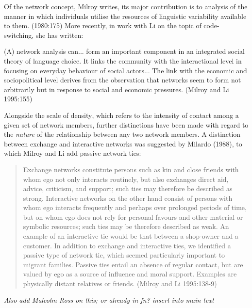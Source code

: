 Of the network concept, Milroy writes, its major contribution is to analysis of the manner in which individuals utilise the resources of linguistic variability available to them. (1980:175) More recently, in work with Li on the topic of code-switching, she has written:

(A) network analysis can... form an important component in an integrated social theory of language choice. It links the community with the interactional level in focusing on everyday behaviour of social actors...  The link with the economic and sociopolitical level derives from the observation that networks seem to form not arbitrarily but in response to social and economic pressures. (Milroy and Li 1995:155)

Alongside the scale of density, which refers to the intensity of contact among a given set of network members, further distinctions have been made with regard to the \textit{nature} of the relationship between any two network members. A distinction between exchange and interactive networks was suggested by Milardo (1988), to which Milroy and Li add passive network ties:

	\begin{quotation}
	Exchange networks constitute persons such as kin and close friends with whom ego not only interacts routinely, but also exchanges direct aid, advice, criticism, and support; such ties may therefore be described as strong.  Interactive networks on the other hand consist of persons with whom ego interacts frequently and perhaps over prolonged periods of time, but on whom ego does not rely for personal favours and other material or symbolic resources; such ties may be therefore described as weak. An example of an interactive tie would be that between a shop-owner and a customer. In addition to exchange and interactive ties, we identified a passive type of network tie, which seemed particularly important to migrant families. Passive ties entail an absence of regular contact, but are valued by ego as a source of influence and moral support. Examples are physically distant relatives or friends. (Milroy and Li 1995:138-9)

	\end{quotation}
\textit{Also add Malcolm Ross on this; or already in fn? insert into main text}

 

\newpage
